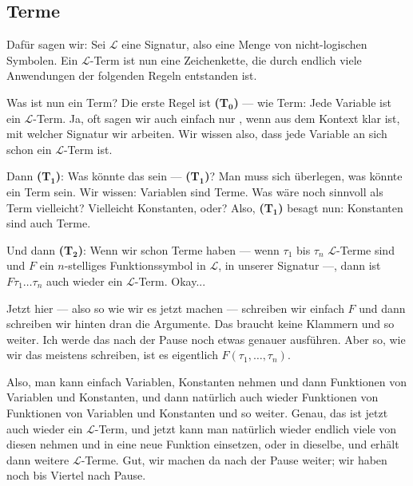 \begin{ai-global-state-checkpoint-invisible-content}
\end{ai-global-state-checkpoint-invisible-content}

\subsection{Terme}

\begin{spoken-clean}[00:34:59 - 00:36:44]
Dafür sagen wir: Sei $\mathcal{L}$ eine Signatur, also eine Menge von nicht-logischen Symbolen. Ein $\mathcal{L}$-Term ist nun eine Zeichenkette, die durch endlich viele Anwendungen der folgenden Regeln entstanden ist.

Was ist nun ein Term? Die erste Regel ist \textbf{(T$_{\mathbf{0}}$)} ---  wie Term: Jede Variable ist ein $\mathcal{L}$-Term. Ja, oft sagen wir auch einfach nur , wenn aus dem Kontext klar ist, mit welcher Signatur wir arbeiten. Wir wissen also, dass jede Variable an sich schon ein $\mathcal{L}$-Term ist.
\end{spoken-clean}

\begin{spoken-clean}[00:36:44 - 00:38:29]
Dann \textbf{(T$_{\mathbf{1}}$)}: Was könnte das sein --- \textbf{(T$_{\mathbf{1}}$)}? Man muss sich überlegen, was könnte ein Term sein. Wir wissen: Variablen sind Terme. Was wäre noch sinnvoll als Term vielleicht? Vielleicht Konstanten, oder? Also, \textbf{(T$_{\mathbf{1}}$)} besagt nun: Konstanten sind auch Terme.

Und dann \textbf{(T$_{\mathbf{2}}$)}: Wenn wir schon Terme haben --- wenn $\tau_1$ bis $\tau_n$ $\mathcal{L}$-Terme sind und $F$ ein $n$-stelliges Funktionssymbol in $\mathcal{L}$, in unserer Signatur ---, dann ist $F \tau_1 \dots \tau_n$ auch wieder ein $\mathcal{L}$-Term. Okay...
\end{spoken-clean}

\begin{spoken-clean}[00:38:29 - 00:41:14]
Jetzt hier --- also so wie wir es jetzt machen --- schreiben wir einfach $F$ und dann schreiben wir hinten dran die Argumente. Das braucht keine Klammern und so weiter. Ich werde das nach der Pause noch etwas genauer ausführen. Aber so, wie wir das meistens schreiben, ist es eigentlich $F(\tau_1, \dots, \tau_n)$.

Also, man kann einfach Variablen, Konstanten nehmen und dann Funktionen von Variablen und Konstanten, und dann natürlich auch wieder Funktionen von Funktionen von Variablen und Konstanten und so weiter. Genau, das ist jetzt auch wieder ein $\mathcal{L}$-Term, und jetzt kann man natürlich wieder endlich viele von diesen nehmen und in eine neue Funktion einsetzen, oder in dieselbe, und erhält dann weitere $\mathcal{L}$-Terme. Gut, wir machen da nach der Pause weiter; wir haben noch bis Viertel nach Pause.
\end{spoken-clean}

